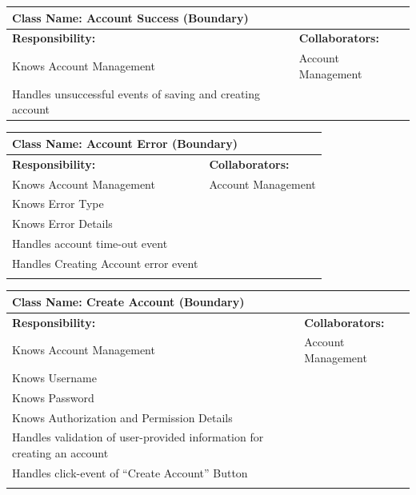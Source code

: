 \documentclass[]{article}
\begin{document}
	\begin{table}[ht]
		\centering
		\begin{tabular}{|p{7cm}|p{7cm}|}
		\hline 
		 \multicolumn{2}{|l|}{\textbf{Class Name:} Account Success (Boundary)} \\
		\hline
		\textbf{Responsibility:} & \textbf{Collaborators:} \\
		\hline
		Knows Account Management & Account Management\\
		Handles unsuccessful events of saving and creating account
		\vspace{0.1in} & \\
		\hline
		\end{tabular}
	\end{table}

	\begin{table}[ht]
		\centering
		\begin{tabular}{|p{7cm}|p{7cm}|}
		\hline 
		 \multicolumn{2}{|l|}{\textbf{Class Name:} Account Error (Boundary)} \\
		\hline
		\textbf{Responsibility:} & \textbf{Collaborators:} \\
		\hline
		Knows Account Management & Account Management \\
		Knows Error Type &\\
		Knows Error Details &\\
		Handles account time-out event &\\
		Handles Creating Account error event &\\
		\vspace{0.1in} & \\
		\hline
		\end{tabular}
	\end{table}

	\begin{table}[ht]
		\centering
		\begin{tabular}{|p{7cm}|p{7cm}|}
		\hline 
		 \multicolumn{2}{|l|}{\textbf{Class Name:} Create Account (Boundary)} \\
		\hline
		\textbf{Responsibility:} & \textbf{Collaborators:} \\
		\hline
			Knows Account Management  & Account Management\\
			Knows Username &\\
			Knows Password &\\
			Knows Authorization and Permission Details &\\
			Handles validation of user-provided information for creating an account &\\
			Handles click-event of “Create Account” Button &\\
		\vspace{0.1in} & \\
		\hline
		\end{tabular}
	\end{table}
\end{document}
